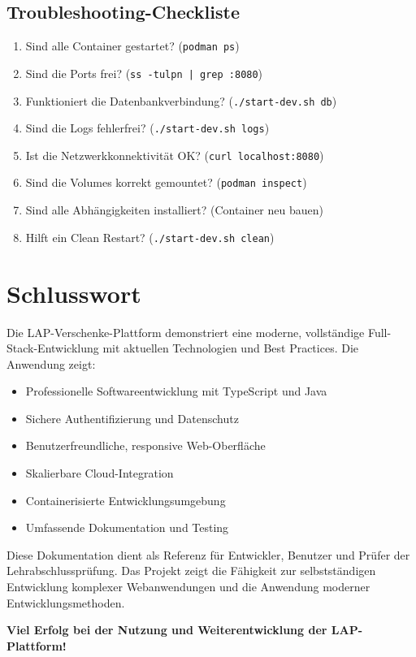 \documentclass[a4paper,12pt]{article}
\begin{document}
\subsection{Troubleshooting-Checkliste}
\begin{enumerate}
    \item Sind alle Container gestartet? (\texttt{podman ps})
    \item Sind die Ports frei? (\texttt{ss -tulpn | grep :8080})
    \item Funktioniert die Datenbankverbindung? (\texttt{./start-dev.sh db})
    \item Sind die Logs fehlerfrei? (\texttt{./start-dev.sh logs})
    \item Ist die Netzwerkkonnektivität OK? (\texttt{curl localhost:8080})
    \item Sind die Volumes korrekt gemountet? (\texttt{podman inspect})
    \item Sind alle Abhängigkeiten installiert? (Container neu bauen)
    \item Hilft ein Clean Restart? (\texttt{./start-dev.sh clean})
\end{enumerate}

\section{Schlusswort}

Die LAP-Verschenke-Plattform demonstriert eine moderne, vollständige Full-Stack-Entwicklung mit aktuellen Technologien und Best Practices. Die Anwendung zeigt:

\begin{itemize}
    \item Professionelle Softwareentwicklung mit TypeScript und Java
    \item Sichere Authentifizierung und Datenschutz
    \item Benutzerfreundliche, responsive Web-Oberfläche
    \item Skalierbare Cloud-Integration
    \item Containerisierte Entwicklungsumgebung
    \item Umfassende Dokumentation und Testing
\end{itemize}

Diese Dokumentation dient als Referenz für Entwickler, Benutzer und Prüfer der Lehrabschlussprüfung. Das Projekt zeigt die Fähigkeit zur selbstständigen Entwicklung komplexer Webanwendungen und die Anwendung moderner Entwicklungsmethoden.

\textbf{Viel Erfolg bei der Nutzung und Weiterentwicklung der LAP-Plattform!}
\end{document}
